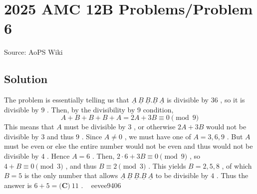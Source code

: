 \documentclass[12pt]{article}
\begin{document}
\section*{{2025 AMC 12B Problems/Problem 6}}
Source: AoPS Wiki

\subsection*{Solution}
The problem is essentially telling us that $\underline A~\underline B~\underline B.\underline B~\underline A$ is divisible by $36$ , so it is divisible by $9$ . Then, by the divisibility by $9$ condition, \[A+B+B+B+A=2A+3B\equiv 0\pmod{9}\] This means that $A$ must be divisible by $3$ , or otherwise $2A+3B$ would not be divisible by $3$ and thus $9$ . Since $A\ne0$ , we must have one of $A=3,6,9$ . But $A$ must be even or else the entire number would not be even and thus would not be divisible by $4$ . Hence $A=6$ . Then, $2\cdot 6+3B\equiv 0\pmod{9}$ , so $4+B\equiv 0\pmod{3}$ , and thus $B\equiv 2\pmod{3}$ . This yields $B=2,5,8$ , of which $B=5$ is the only number that allows $\underline A~\underline B~\underline B.\underline B~\underline A$ to be divisible by $4$ . Thus the answer is $6+5=\boxed{\textbf{(C)}~11}$ . ~ eevee9406
\end{document}
